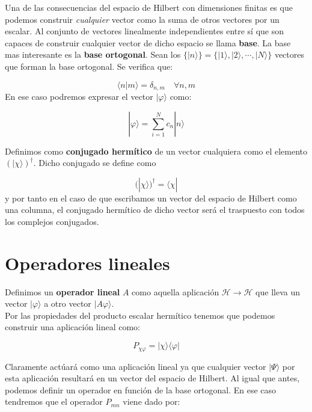 \documentclass[12pt]{book}
\numberwithin{equation}{chapter}
\numberwithin{figure}{chapter}
\begin{document}
Una de las consecuencias del espacio de Hilbert con dimensiones finitas es que podemos construir \textit{cualquier} vector como la suma de otros vectores por un escalar. Al conjunto de vectores linealmente independientes entre sí que son capaces de construir cualquier vector de dicho espacio se llama \textbf{base}. La base mas interesante es la \textbf{base ortogonal}. Sean los $\{ | n \rangle \} = \{ | 1 \rangle , | 2 \rangle , \cdots, | N \rangle \}$ vectores que forman la base ortogonal. Se verifica que:

\begin{equation}
\langle n | m \rangle = \delta_{n,m} \quad \forall n,m
\end{equation}
En ese caso podremos expresar el vector $| \varphi \rangle$ como:

\begin{equation}
| \varphi \rangle = \sum_{i=1}^N c_n | n \rangle
\end{equation}

Definimos como \textbf{conjugado hermítico} de un vector cualquiera como el elemento $(| \chi \rangle )^\dagger$. Dicho conjugado se define como

\begin{equation}
(| \chi \rangle )^\dagger = \langle \chi |
\end{equation}
y por tanto en el caso de que escribamos un vector del espacio de Hilbert como una columna, el conjugado hermítico de dicho vector será el traspuesto con todos los complejos conjugados. 

\section{Operadores lineales}

Definimos un \textbf{operador lineal} $A$ como aquella aplicación $\mathcal{H} \rightarrow \mathcal{H}$ que lleva un vector $| \varphi \rangle$ a otro vector $|A \varphi \rangle$. \\

Por las propiedades del producto escalar hermítico tenemos que podemos construir una aplicación lineal como:

\begin{equation}
P_{\chi \varphi} = | \chi \rangle \langle \varphi | \label{Ec:01.02-01}
\end{equation}

Claramente actúará como una aplicación lineal ya que cualquier vector $| \Psi \rangle$ por esta aplicación resultará en un vector del espacio de Hilbert. Al igual que antes, podemos definir un operador en función de la base ortogonal. En ese caso tendremos que el operador $P_{mn}$ viene dado por:
\end{document}
